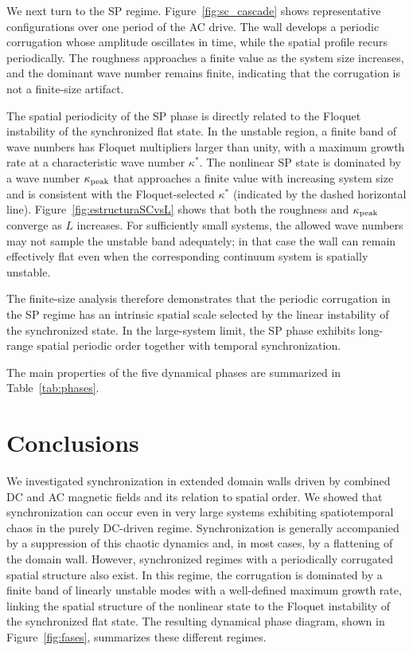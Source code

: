 \documentclass[prb,aps,twocolumn,superscriptaddress,floatfix]{revtex4-1}
\begin{document}
We next turn to the SP regime. Figure~\ref{fig:sc_cascade} shows representative configurations over one period of the AC drive. The wall develops a periodic corrugation whose amplitude oscillates in time, while the spatial profile recurs periodically. The roughness approaches a finite value as the system size increases, and the dominant wave number remains finite, indicating that the corrugation is not a finite-size artifact. 

The spatial periodicity of the SP phase is directly related to the Floquet instability of the synchronized flat state. In the unstable region, a finite band of wave numbers has Floquet multipliers larger than unity, with a maximum growth rate at a characteristic wave number $\kappa^*$. The nonlinear SP state is dominated by a wave number $\kappa_{\rm peak}$ that approaches a finite value with increasing system size and is consistent with the Floquet-selected $\kappa^*$ (indicated by the dashed horizontal line). Figure~\ref{fig:estructuraSCvsL} shows that both the roughness and $\kappa_{\rm peak}$ converge as $L$ increases. For sufficiently small systems, the allowed wave numbers may not sample the unstable band adequately; in that case the wall can remain effectively flat even when the corresponding continuum system is spatially unstable.

The finite-size analysis therefore demonstrates that the periodic corrugation in the SP regime has an intrinsic spatial scale selected by the linear instability of the synchronized state. In the large-system limit, the SP phase exhibits long-range spatial periodic order together with temporal synchronization.

The main properties of the five dynamical phases are summarized in Table~\ref{tab:phases}.















\section{Conclusions}
We investigated synchronization in extended domain walls driven by combined DC and AC magnetic fields and its relation to spatial order. We showed that synchronization can occur even in very large systems exhibiting spatiotemporal chaos in the purely DC-driven regime. Synchronization is generally accompanied by a suppression of this chaotic dynamics and, in most cases, by a flattening of the domain wall. However, synchronized regimes with a periodically corrugated spatial structure also exist. In this regime, the corrugation is dominated by a finite band of linearly unstable modes with a well-defined maximum growth rate, linking the spatial structure of the nonlinear state to the Floquet instability of the synchronized flat state. The resulting dynamical phase diagram, shown in Figure~\ref{fig:fases}, summarizes these different regimes.
\end{document}

